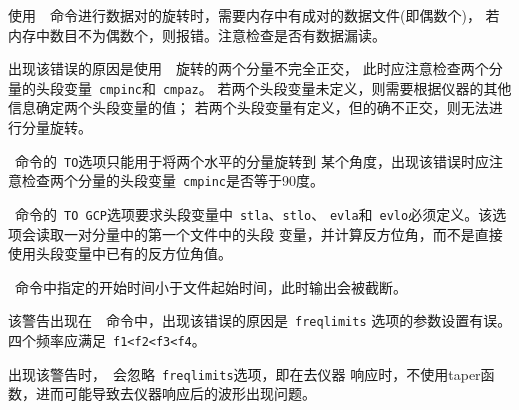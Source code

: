 使用~~命令进行数据对的旋转时，需要内存中有成对的数据文件(即偶数个)，
若内存中数目不为偶数个，则报错。注意检查是否有数据漏读。

出现该错误的原因是使用~~旋转的两个分量不完全正交，
此时应注意检查两个分量的头段变量~\verb+cmpinc+和~\verb+cmpaz+。
若两个头段变量未定义，则需要根据仪器的其他信息确定两个头段变量的值；
若两个头段变量有定义，但的确不正交，则无法进行分量旋转。

~命令的~\verb+TO+选项只能用于将两个水平的分量旋转到
某个角度，出现该错误时应注意检查两个分量的头段变量~\verb+cmpinc+是否等于90度。

~命令的~\verb+TO GCP+选项要求头段变量中~\verb+stla+、\verb+stlo+、
\verb+evla+和~\verb+evlo+必须定义。该选项会读取一对分量中的第一个文件中的头段
变量，并计算反方位角，而不是直接使用头段变量中已有的反方位角值。

~命令中指定的开始时间小于文件起始时间，此时输出会被截断。

该警告出现在~~命令中，出现该错误的原因是~\verb+freqlimits+
选项的参数设置有误。四个频率应满足~\verb+f1<f2<f3<f4+。

出现该警告时，~会忽略~\verb+freqlimits+选项，即在去仪器
响应时，不使用taper函数，进而可能导致去仪器响应后的波形出现问题。
